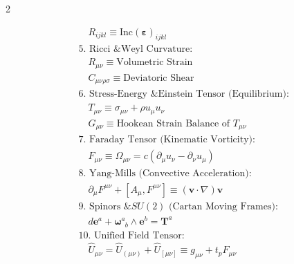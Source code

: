 \begin{multicols}{2}
\begin{tcolorbox}[cheatbox, title={\refstepcounter{cheatnum}\label{box:rosetta_stone}\thecheatnum. Tensor Evolution \& Geometry\scriptsize\hfill\hyperref[sec:deriv_rosetta_stone]{[Proof $\downarrow$]}}]
\begin{align}
    &\quad R_{ijkl} \equiv \text{Inc}(\boldsymbol{\varepsilon})_{ijkl} \label{eq:rosetta_riemann} \\
    &\text{5. Ricci \& Weyl Curvature:} \nonumber \\
    &\quad R_{\mu\nu} \equiv \text{Volumetric Strain} \label{eq:rosetta_ricci} \\ 
    &\quad C_{\mu\nu\rho\sigma} \equiv \text{Deviatoric Shear} \label{eq:rosetta_weyl} \\
    &\text{6. Stress-Energy \& Einstein Tensor (Equilibrium):} \nonumber \\
    &\quad T_{\mu\nu} \equiv \sigma_{\mu\nu} + \rho u_\mu u_\nu \label{eq:rosetta_stress_energy} \\
    &\quad G_{\mu\nu} \equiv \text{Hookean Strain Balance of } T_{\mu\nu} \label{eq:rosetta_einstein_tensor} \\
    &\text{7. Faraday Tensor (Kinematic Vorticity):} \nonumber \\
    &\quad F_{\mu\nu} \equiv \Omega_{\mu\nu} = c (\partial_\mu u_\nu - \partial_\nu u_\mu) \label{eq:rosetta_faraday} \\
    &\text{8. Yang-Mills (Convective Acceleration):} \nonumber \\
    &\quad \partial_\mu F^{\mu\nu} + [A_\mu, F^{\mu\nu}] \equiv (\mathbf{v} \cdot \nabla)\mathbf{v} \label{eq:rosetta_yang_mills} \\
    &\text{9. Spinors \& $SU(2)$ (Cartan Moving Frames):} \nonumber \\
    &\quad d\mathbf{e}^a + \boldsymbol{\omega}^a_{\phantom{a}b} \wedge \mathbf{e}^b = \mathbf{T}^a \label{eq:rosetta_cartan}  \\
    &\text{10. Unified Field Tensor:} \nonumber \\
    &\quad \hat{U}_{\mu\nu} = \hat{U}_{(\mu\nu)} + \hat{U}_{[\mu\nu]} \equiv g_{\mu\nu} + t_p F_{\mu\nu} \label{eq:unified_tensor_decomposition}
\end{align}
\end{tcolorbox}


\end{multicols}
